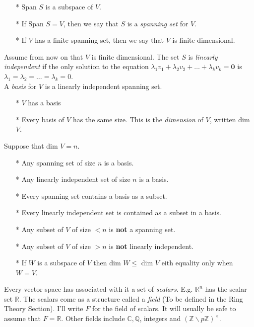 \documentclass[twoside]{scrartcl}
\begin{document}
\begin{itemize}
\item[*] Span $S$ is a subspace of $V$.
\item[*] If Span $S = V$, then we say that $S$ is a \emph{spanning set} for $V$. 
\item[*] If $V$ has a finite spanning set, then we say that $V$ is finite dimensional.
\end{itemize}


Assume from now on that $V$ is finite dimensional. The set $S$ is \emph{linearly independent} if the only solution to the equation $\lambda_1v_1 + \lambda_2v_2 + \dots + \lambda_kv_k = \mathbf{0}$ is $\lambda_1 = \lambda_2 = \dots = \lambda_k = 0.$\\

A \emph{basis} for $V$ is a linearly independent spanning set.

\begin{itemize}
\item[*] $V$ has a basis
\item[*] Every basis of $V$ has the same size. This is the \emph{dimension} of $V$, written dim $V$. 
\end{itemize}

Suppose that dim $V = n$.
\begin{itemize}
\item[*] Any spanning set of size $n$ is a basis. 
\item[*] Any linearly independent set of size $n$ is a basis.
\item[*] Every spanning set contains a basis as a subset.
\item[*] Every linearly independent set is contained as a subset in a basis.
\item[*] Any subset of $V$ of size $< n$ is \textbf{not} a spanning set.
\item[*] Any subset of $V$ of size $>n$ is \textbf{not} linearly independent. 
\item[*] If $W$ is a subspace of $V$ then dim $W \leq $ dim $V$ eith equality only when $W = V$. 
\end{itemize}\vspace*{5pt}

Every vector space has associated with it a set of \emph{scalars}. E.g. $\mathbb{R}^n$ has the scalar set $\mathbb{R}.$ The scalars come as a structure called a \emph{field} (To be defined in the Ring Theory Section). I'll write $F$ for the field of scalars. It will usually be safe to assume that $F = \mathbb{R}$. Other fields include $\mathbb{C}, \mathbb{Q}$, integers and $(\mathbb{Z}\backslash p \mathbb{Z})^{\times}$.
\end{document}
